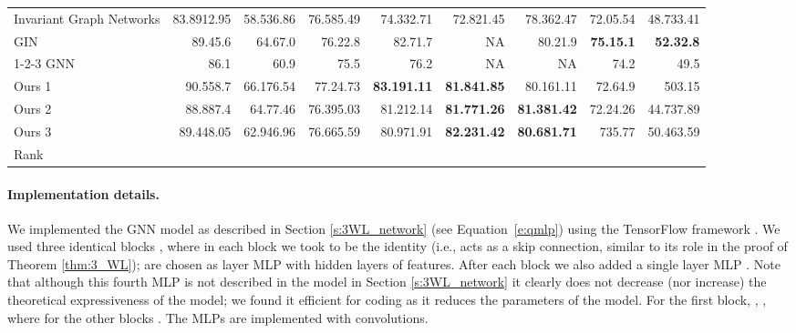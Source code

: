 \documentclass{article}
\newcommand{\ie}{{i.e.}}
\def\Eqref#1{Equation~\ref{#1}}
\begin{document}
\begin{table}[t]
{\begin{tabular}{@{\hskip8pt}l@{\hskip8pt}r@{\hskip8pt}r@{\hskip8pt}r@{\hskip8pt}r@{\hskip8pt}r@{\hskip8pt}r@{\hskip8pt}r@{\hskip8pt}r@{\hskip8pt}}
		
	Invariant Graph Networks \citep{maron2018invariant}  & 83.8912.95     & 58.536.86     &  76.585.49     & 74.332.71     & 72.821.45     & 78.362.47  & 72.05.54   & 48.733.41 \\
		GIN  \citep{xu2018how}& 89.45.6     & 64.67.0     &  76.22.8     & 82.71.7     & NA     & 80.21.9  & \bf{75.15.1} & \bf{52.32.8} \\
		1-2-3 GNN \citep{morris2018weisfeiler} & 86.1    & 60.9     &  75.5     & 76.2     & NA     & NA  & 74.2 & 49.5 \\
Ours 1  & 90.558.7     & 66.176.54     &  77.24.73     &  \bf{83.191.11}  & \bf{81.841.85}     & 80.161.11  & 72.64.9 & 503.15 \\
		Ours 2  & 88.887.4  &  64.77.46  &  76.395.03  &  81.212.14  &  \bf{81.771.26}  &  \bf{81.381.42}  &  72.24.26  &  44.737.89  \\
		Ours 3  & 89.448.05  &  62.946.96  &  76.665.59  &  80.971.91  &  \bf{82.231.42}  &  \bf{80.681.71}  &  735.77  &  50.463.59   \\
		Rank &  &  &  &  &  &  &  &  \\
		\bottomrule
	\end{tabular}}
	\label{tab:class_res}\vspace{-10pt}
\end{table}\paragraph{Implementation details.} We implemented the GNN model as described in Section \ref{s:3WL_network} (see \Eqref{e:qmlp}) using the TensorFlow framework \citep{abadi2016tensorflow}. We used three identical blocks , where in each block  we took  to be the identity (\ie,  acts as a skip connection, similar to its role in the proof of Theorem \ref{thm:3_WL});  are chosen as  layer MLP with hidden layers of  features. After each block  we also added a single layer MLP . Note that although this fourth MLP is not described in the model in Section \ref{s:3WL_network} it clearly does not decrease (nor increase) the theoretical expressiveness of the model; we found it efficient for coding as it reduces the parameters of the model. For the first block, , , where for the other blocks . The MLPs are implemented with  convolutions.
\end{document}

